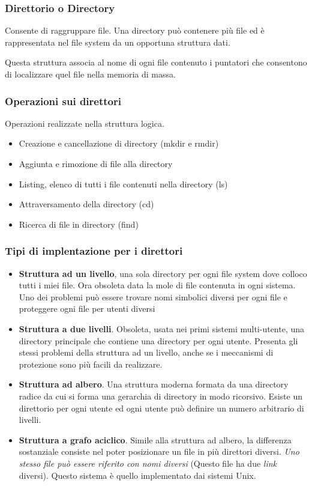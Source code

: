 \documentclass
[10pt,        %
 a4paper,     %
 onecolumn,   %
 fleqn,       %
 oneside,     %
 notitlepage, %
]{article}    %
\begin{document}
\subsubsection{Direttorio o Directory}
Consente di raggruppare file. Una directory può contenere più file ed è rappresentata nel file system da un opportuna struttura dati.

Questa struttura associa al nome di ogni file contenuto i puntatori che consentono di localizzare quel file nella memoria di massa.

\subsubsection{Operazioni sui direttori}
Operazioni realizzate nella struttura logica.
\begin{itemize}
    \item Creazione e cancellazione di directory (mkdir e rmdir)
    \item Aggiunta e rimozione di file alla directory
    \item Listing, elenco di tutti i file contenuti nella directory (ls)
    \item Attraversamento della directory (cd)
    \item Ricerca di file in directory (find)
\end{itemize}



\subsubsection{Tipi di implentazione per i direttori}
\begin{itemize}
    \item \textbf{Struttura ad un livello}, una sola directory per ogni file system dove colloco tutti i miei file. Ora obsoleta data la mole di file contenuta in ogni sistema. Uno dei problemi può essere trovare nomi simbolici diversi per ogni file e proteggere ogni file per utenti diversi
    \item \textbf{Struttura a due livelli}. Obsoleta, usata nei primi sistemi multi-utente, una directory principale che contiene una directory per ogni utente. Presenta gli stessi problemi della struttura ad un livello, anche se i meccanismi di protezione sono più facili da realizzare.
    \item \textbf{Struttura ad albero}. Una struttura moderna formata da una directory radice da cui si forma una gerarchia di directory in modo ricorsivo. Esiste un direttorio per ogni utente ed ogni utente può definire un numero arbitrario di livelli.
    \item \textbf{Struttura a grafo aciclico}. Simile alla struttura ad albero, la differenza sostanziale consiste nel poter posizionare un file in più direttori diversi. \textit{Uno stesso file può essere riferito con nomi diversi} (Questo file ha due \textit{link} diversi). Questo sistema è quello implementato dai sistemi Unix.
\end{itemize}
\end{document}
